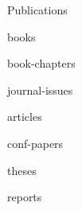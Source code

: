 \documentclass{article}
\begin{document}
\begin{cv}


	\begin{cvlist}{Publications}
		\item[Books]
		\begin{btSect}{books}
			\btPrintAll
		\end{btSect}

		\item[Book Chapters]
		\begin{btSect}{book-chapters}
			\btPrintAll
		\end{btSect}

		\item[Edited Journal Issues]
		\begin{btSect}{journal-issues}
			\btPrintAll
		\end{btSect}

		\item[Ref.~Jour.~Papers]
		\begin{btSect}{articles}
			\btPrintAll
		\end{btSect}

		\item[Ref.~Conf.~Papers]
		\begin{btSect}{conf-papers}
			\btPrintAll
		\end{btSect}

		\item[Theses]
		\begin{btSect}{theses}
			\btPrintAll
		\end{btSect}

		\item[Reports]
		\begin{btSect}{reports}
			\btPrintAll
		\end{btSect}

	\end{cvlist}


\end{cv}
\end{document}
